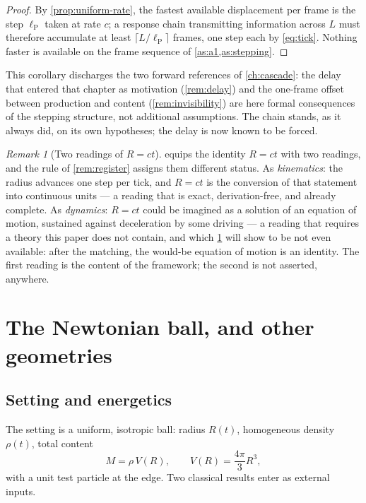 \documentclass[11pt]{amsbook}
\theoremstyle{plain}
\theoremstyle{definition}
\theoremstyle{remark}
\newtheorem{remark}[theorem]{Remark}
\begin{document}
\begin{proof}
By \cref{prop:uniform-rate}, the fastest available displacement per frame is the step $\ell_{\mathrm P}$ taken at rate $c$; a response chain transmitting information across $L$ must therefore accumulate at least $\lceil L/\ell_{\mathrm P}\rceil$ frames, one step each by \cref{eq:tick}. Nothing faster is available on the frame sequence of \cref{as:a1,as:stepping}.
\end{proof}

This corollary discharges the two forward references of \cref{ch:cascade}: the delay that entered that chapter as motivation (\cref{rem:delay}) and the one-frame offset between production and content (\cref{rem:invisibility}) are here formal consequences of the stepping structure, not additional assumptions. The chain stands, as it always did, on its own hypotheses; the delay is now known to be forced.

\begin{remark}[Two readings of $R = ct$]\label{rem:tworeadings}
 equips the identity $R = ct$ with two readings, and the rule of \cref{rem:register} assigns them different status. As \emph{kinematics}: the radius advances one step per tick, and $R = ct$ is the conversion of that statement into continuous units --- a reading that is exact, derivation-free, and already complete. As \emph{dynamics}: $R = ct$ could be imagined as a solution of an equation of motion, sustained against deceleration by some driving --- a reading that requires a theory this paper does not contain, and which \cref{sec:newton-ball} will show to be not even available: after the matching, the would-be equation of motion is an identity. The first reading is the content of the framework; the second is not asserted, anywhere.
\end{remark}

\section{The Newtonian ball, and other geometries}\label{sec:newton-ball}

\subsection{Setting and energetics}\label{sec:ball-setting}

The setting is a uniform, isotropic ball: radius $R(t)$, homogeneous density $\rho(t)$, total content
\begin{equation}\label{eq:ballmass}
M = \rho\, V(R), \qquad V(R) = \frac{4\pi}{3} R^{3},
\end{equation}
with a unit test particle at the edge. Two classical results enter as external inputs.
\end{document}

